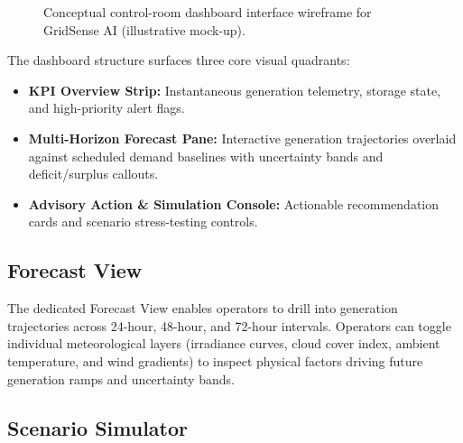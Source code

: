 \begin{figure}[htbp]
    \caption{Conceptual control-room dashboard interface wireframe for GridSense AI (illustrative mock-up).}
    \label{fig:conceptual_dashboard}
\end{figure}

The dashboard structure surfaces three core visual quadrants:
\begin{itemize}[leftmargin=1.8em, itemsep=0.2em]
    \item \textbf{KPI Overview Strip:} Instantaneous generation telemetry, storage state, and high-priority alert flags.
    \item \textbf{Multi-Horizon Forecast Pane:} Interactive generation trajectories overlaid against scheduled demand baselines with uncertainty bands and deficit/surplus callouts.
    \item \textbf{Advisory Action \& Simulation Console:} Actionable recommendation cards and scenario stress-testing controls.
\end{itemize}

\subsection{Forecast View}
\label{subsec:forecast_view}

The dedicated Forecast View enables operators to drill into generation trajectories across 24-hour, 48-hour, and 72-hour intervals. Operators can toggle individual meteorological layers (irradiance curves, cloud cover index, ambient temperature, and wind gradients) to inspect physical factors driving future generation ramps and uncertainty bands.

\subsection{Scenario Simulator}
\label{subsec:scenario_simulator}

